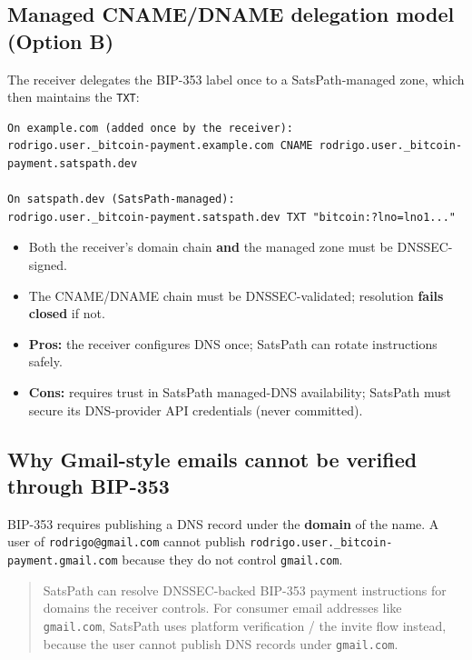 \documentclass[
]{article}
\providecommand{\tightlist}{%
  \setlength{\itemsep}{0pt}\setlength{\parskip}{0pt}}
\begin{document}
\hypertarget{managed-cnamedname-delegation-model-option-b}{%
\subsection{Managed CNAME/DNAME delegation model (Option
B)}\label{managed-cnamedname-delegation-model-option-b}}

The receiver delegates the BIP-353 label once to a SatsPath-managed
zone, which then maintains the \texttt{TXT}:

\begin{verbatim}
On example.com (added once by the receiver):
rodrigo.user._bitcoin-payment.example.com CNAME rodrigo.user._bitcoin-payment.satspath.dev

On satspath.dev (SatsPath-managed):
rodrigo.user._bitcoin-payment.satspath.dev TXT "bitcoin:?lno=lno1..."
\end{verbatim}

\begin{itemize}
\tightlist
\item
  Both the receiver's domain chain \textbf{and} the managed zone must be
  DNSSEC-signed.
\item
  The CNAME/DNAME chain must be DNSSEC-validated; resolution
  \textbf{fails closed} if not.
\item
  \textbf{Pros:} the receiver configures DNS once; SatsPath can rotate
  instructions safely.
\item
  \textbf{Cons:} requires trust in SatsPath managed-DNS availability;
  SatsPath must secure its DNS-provider API credentials (never
  committed).
\end{itemize}

\hypertarget{why-gmail-style-emails-cannot-be-verified-through-bip-353}{%
\subsection{Why Gmail-style emails cannot be verified through
BIP-353}\label{why-gmail-style-emails-cannot-be-verified-through-bip-353}}

BIP-353 requires publishing a DNS record under the \textbf{domain} of
the name. A user of \texttt{rodrigo@gmail.com} cannot publish
\texttt{rodrigo.user.\_bitcoin-payment.gmail.com} because they do not
control \texttt{gmail.com}.

\begin{quote}
SatsPath can resolve DNSSEC-backed BIP-353 payment instructions for
domains the receiver controls. For consumer email addresses like
\texttt{gmail.com}, SatsPath uses platform verification / the invite
flow instead, because the user cannot publish DNS records under
\texttt{gmail.com}.
\end{quote}
\end{document}

